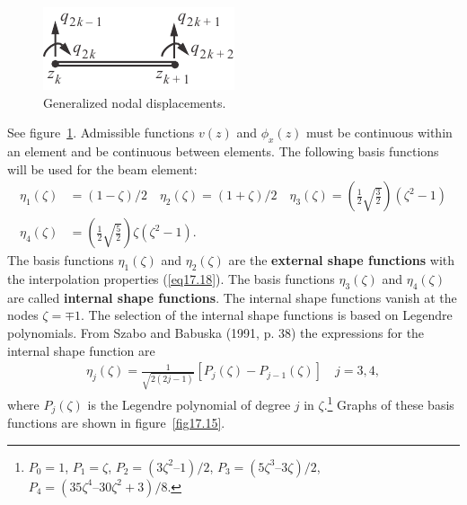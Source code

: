 \documentclass{AeroStructure-ERJohnson}
\begin{document}
\begin{figure}
\includegraphics{Figure_17-14.pdf}
\caption{Generalized nodal displacements.\label{fig17.14}}
\end{figure}


See figure~\ref{fig17.14}. Admissible functions $v(z)$ and $\phi_{x}(z)$ must be continuous within an element and be continuous between elements. The following basis functions will be used for the beam element:
\begin{align}
\eta_{1}(\zeta) &=(1-\zeta)/2 \quad \eta_{2}(\zeta)=(1+\zeta)/2 \quad \eta_{3}(\zeta)=\left(\frac{1}{2} \sqrt{\frac{3}{2}}\right)\left(\zeta^{2}-1\right)\nonumber\\
\eta_{4}(\zeta)&=\left(\frac{1}{2} \sqrt{\frac{5}{2}}\right) \zeta\left(\zeta^{2}-1\right). \label{eq17.67}
\end{align}
The basis functions $\eta_{1}(\zeta)$ and $\eta_{2}(\zeta)$ are the \textbf{external shape functions} with the interpolation properties (\ref{eq17.18}). The basis functions $\eta_{3}(\zeta)$ and $\eta_{4}(\zeta)$ are called \textbf{internal shape functions}. The internal shape functions vanish at the nodes $\zeta=\mp 1$. The selection of the internal shape functions is based on Legendre polynomials. From Szabo and Babuska (1991, p. 38) the expressions for the internal shape function are
\begin{align}\label{eq17.68}
\eta_{j}(\zeta)=\frac{1}{\sqrt{2(2 j-1)}}\left[P_{j}(\zeta)-P_{j-1}(\zeta)\right] \quad j=3,4,
\end{align}
where $P_{j}(\zeta)$ is the Legendre polynomial of degree $j$ in $\zeta$.\footnote{$P_0 = 1$, $P_1=\zeta$, $P_2 = (3\zeta^{2}–1)/2$, $P_3= (5\zeta^{3}–3\zeta)/2$, $P_4 = (35\zeta^{4}–30\zeta^{2}+3)/8$.} Graphs of these basis functions are shown in figure~\ref{fig17.15}.

{\def\thefigure{17.15}
}
\end{document}
